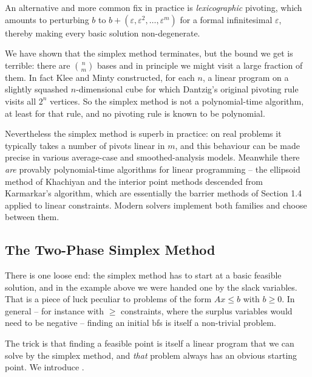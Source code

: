 An alternative and more common fix in practice is \emph{lexicographic} pivoting, which amounts to perturbing $b$ to $b + (\varepsilon, \varepsilon^2, \dots, \varepsilon^m)$ for a formal infinitesimal $\varepsilon$, thereby making every basic solution non-degenerate.

\begin{remark}
    We have shown that the simplex method terminates, but the bound we get is terrible: there are $\binom nm$ bases and in principle we might visit a large fraction of them. In fact Klee and Minty constructed, for each $n$, a linear program on a slightly squashed $n$-dimensional cube for which Dantzig's original pivoting rule visits all $2^n$ vertices. So the simplex method is not a polynomial-time algorithm, at least for that rule, and no pivoting rule is known to be polynomial.

    Nevertheless the simplex method is superb in practice: on real problems it typically takes a number of pivots linear in $m$, and this behaviour can be made precise in various average-case and smoothed-analysis models. Meanwhile there \emph{are} provably polynomial-time algorithms for linear programming -- the ellipsoid method of Khachiyan and the interior point methods descended from Karmarkar's algorithm, which are essentially the barrier methods of Section 1.4 applied to linear constraints. Modern solvers implement both families and choose between them.
\end{remark}

\subsection{The Two-Phase Simplex Method}

There is one loose end: the simplex method has to start at a basic feasible solution, and in the example above we were handed one by the slack variables. That is a piece of luck peculiar to problems of the form $Ax \leq b$ with $b \geq 0$. In general -- for instance with $\geq$ constraints, where the surplus variables would need to be negative -- finding an initial bfs is itself a non-trivial problem.

The trick is that finding a feasible point is itself a linear program that we can solve by the simplex method, and \emph{that} problem always has an obvious starting point. We introduce .

